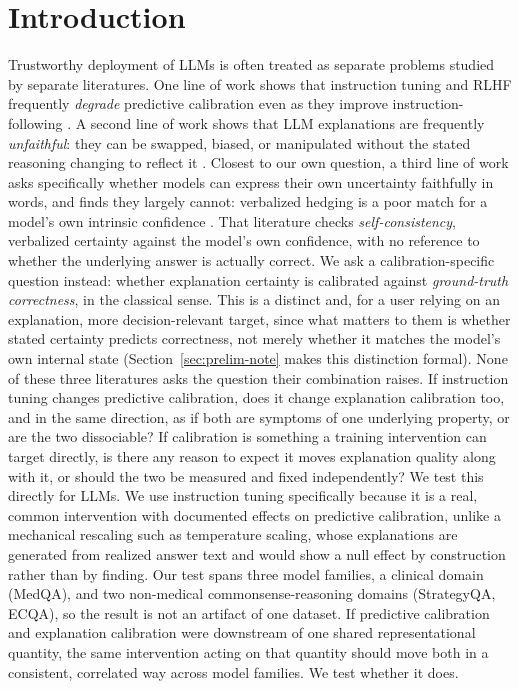 \documentclass[letterpaper]{article} %
\begin{document}
\section{Introduction} Trustworthy deployment of LLMs is often treated as separate problems studied by separate literatures. One line of work shows that instruction tuning and RLHF frequently \emph{degrade} predictive calibration even as they improve instruction-following \citep{zhu2023calibration,tian2023justask,leng2025taming}. A second line of work shows that LLM explanations are frequently \emph{unfaithful}: they can be swapped, biased, or manipulated without the stated reasoning changing to reflect it \citep{turpin2023language,atanasova2023faithfulness,lanham2023measuring}. Closest to our own question, a third line of work asks specifically whether models can express their own uncertainty faithfully in words, and finds they largely cannot: verbalized hedging is a poor match for a model's own intrinsic confidence \citep{kadavath2022language,lin2022teaching,yona2024llms}. That literature checks \emph{self-consistency}, verbalized certainty against the model's own confidence, with no reference to whether the underlying answer is actually correct. We ask a calibration-specific question instead: whether explanation certainty is calibrated against \emph{ground-truth correctness}, in the classical \citet{guo2017calibration} sense. This is a distinct and, for a user relying on an explanation, more decision-relevant target, since what matters to them is whether stated certainty predicts correctness, not merely whether it matches the model's own internal state (Section~\ref{sec:prelim-note} makes this distinction formal). None of these three literatures asks the question their combination raises. If instruction tuning changes predictive calibration, does it change explanation calibration too, and in the same direction, as if both are symptoms of one underlying property, or are the two dissociable? If calibration is something a training intervention can target directly, is there any reason to expect it moves explanation quality along with it, or should the two be measured and fixed independently? We test this directly for LLMs. We use instruction tuning specifically because it is a real, common intervention with documented effects on predictive calibration, unlike a mechanical rescaling such as temperature scaling, whose explanations are generated from realized answer text and would show a null effect by construction rather than by finding. Our test spans three model families, a clinical domain (MedQA), and two non-medical commonsense-reasoning domains (StrategyQA, ECQA), so the result is not an artifact of one dataset. If predictive calibration and explanation calibration were downstream of one shared representational quantity, the same intervention acting on that quantity should move both in a consistent, correlated way across model families. We test whether it does.
\end{document}
